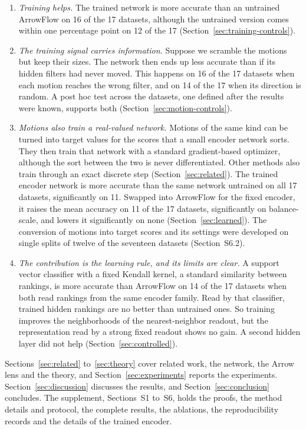 \begin{enumerate}[leftmargin=2em,topsep=2pt,itemsep=1pt]
  \item \emph{Training helps.} The trained network is more accurate than an untrained ArrowFlow on 16 of the 17 datasets, although the untrained version comes within one percentage point on 12 of the 17 (Section~\ref{sec:training-controls}).
  \item \emph{The training signal carries information.} Suppose we scramble the motions but keep their sizes. The network then ends up less accurate than if its hidden filters had never moved. This happens on 16 of the 17 datasets when each motion reaches the wrong filter, and on 14 of the 17 when its direction is random. A post hoc test across the datasets, one defined after the results were known, supports both (Section~\ref{sec:motion-controls}).
  \item \emph{Motions also train a real-valued network.} Motions of the same kind can be turned into target values for the scores that a small encoder network sorts. They then train that network with a standard gradient-based optimizer, although the sort between the two is never differentiated. Other methods also train through an exact discrete step (Section~\ref{sec:related}). The trained encoder network is more accurate than the same network untrained on all 17 datasets, significantly on 11. Swapped into ArrowFlow for the fixed encoder, it raises the mean accuracy on 11 of the 17 datasets, significantly on balance-scale, and lowers it significantly on none (Section~\ref{sec:learned}). The conversion of motions into target scores and its settings were developed on single splits of twelve of the seventeen datasets (Section~S6.2).
  \item \emph{The contribution is the learning rule, and its limits are clear.} A support vector classifier with a fixed Kendall kernel, a standard similarity between rankings, is more accurate than ArrowFlow on 14 of the 17 datasets when both read rankings from the same encoder family. Read by that classifier, trained hidden rankings are no better than untrained ones. So training improves the neighborhoods of the nearest-neighbor readout, but the representation read by a strong fixed readout shows no gain. A second hidden layer did not help (Section~\ref{sec:controlled}).
\end{enumerate}
Sections~\ref{sec:related} to~\ref{sec:theory} cover related work, the network, the Arrow lens and the theory, and Section~\ref{sec:experiments} reports the experiments. Section~\ref{sec:discussion} discusses the results, and Section~\ref{sec:conclusion} concludes. The supplement, Sections~S1 to~S6, holds the proofs, the method details and protocol, the complete results, the ablations, the reproducibility records and the details of the trained encoder.
